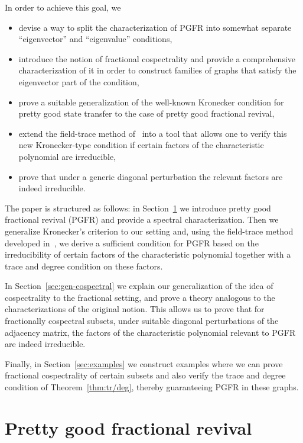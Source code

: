 In order to achieve this goal, we
\begin{itemize}
\item devise a way to split the characterization of PGFR into somewhat separate ``eigenvector'' and ``eigenvalue'' conditions,
\item introduce the notion of fractional cospectrality and provide a comprehensive characterization of it in order to construct families of graphs that satisfy the eigenvector part of the condition,
\item prove a suitable generalization of the well-known Kronecker condition for pretty good state transfer to the case of pretty good fractional revival,
\item extend the field-trace method of~\cite{invol} into a tool that allows one to verify this new Kronecker-type condition if certain factors of the characteristic polynomial are irreducible,
\item prove that under a generic diagonal perturbation the relevant factors are indeed irreducible. 
\end{itemize}

The paper is structured as follows: in Section~\ref{sec:pgfr} we introduce pretty good fractional revival (PGFR) and provide a spectral characterization. Then we generalize Kronecker's criterion to our setting and, using the field-trace method developed in~\cite{invol}, we derive a sufficient condition for PGFR based on the irreducibility of certain factors of the characteristic polynomial together with a trace and degree condition on these factors.

In Section~\ref{sec:gen-cospectral} we explain our generalization of the idea of cospectrality to the fractional setting, and prove a theory analogous to the characterizations of the original notion. This allows us to prove that for fractionally cospectral subsets, under suitable diagonal perturbations of the adjacency matrix, the factors of the characteristic polynomial relevant to PGFR are indeed irreducible. 

Finally, in Section~\ref{sec:examples} we construct examples where we can prove fractional cospectrality of certain subsets and also verify the trace and degree condition of Theorem~\ref{thm:tr/deg}, thereby guaranteeing PGFR in these graphs.

\section{Pretty good fractional revival}\label{sec:pgfr}


